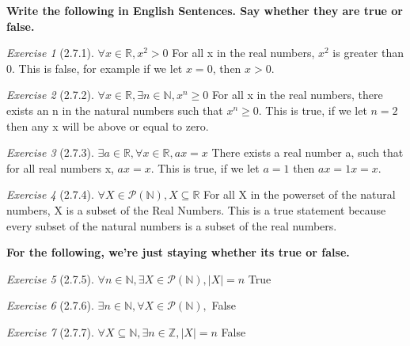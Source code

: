 \documentclass[12pt]{amsart}
\theoremstyle{remark}
\newtheorem*{exercise}{Exercise}%
\newcommand{\RR}{\ensuremath{\mathbb R}} %
\newcommand{\NN}{\ensuremath{\mathbb N}}
\newcommand{\ZZ}{\ensuremath{\mathbb Z}}
\theoremstyle{mycomment}
\begin{document}
\thispagestyle{fancy}

\textbf{Write the following in English Sentences. Say whether they are true or false.}
\begin{exercise}[2.7.1] $\forall x \in \RR, x^2 > 0$ \newline 
For all x in the real numbers, $x^2$ is greater than 0. \newline
This is false, for example if we let $x = 0$, then $x > 0$.
\end{exercise}
\begin{exercise}[2.7.2] $\forall x \in \RR, \exists n \in \NN, x^n \geq 0$ \newline
	For all x in the real numbers, there exists an n in the natural numbers such that $x^n \geq 0$. \newline
	This is true, if we let $n = 2$ then any x will be above or equal to zero.
\end{exercise}
\begin{exercise}[2.7.3] $\exists a \in \RR, \forall x \in \RR, ax=x$ \newline
	There exists a real number a, such that for all real numbers x, $ax = x.$ \newline
	This is true, if we let $a = 1$ then $ax = 1x = x$.
\end{exercise}
\begin{exercise}[2.7.4] $\forall X \in \mathcal{P} (\NN), X \subseteq \RR$ \newline
	For all X in the powerset of the natural numbers, X is a subset of the Real Numbers. \newline
	This is a true statement because every subset of the natural numbers is a subset of the real numbers.
\end{exercise}
\textbf{For the following, we're just staying whether its true or false.}
\begin{exercise}[2.7.5] $\forall n \in \NN, \exists X \in \mathcal{P} (\NN), |X| = n $ \newline
	True
\end{exercise}
\begin{exercise}[2.7.6] $\exists n \in \NN, \forall X \in \mathcal{P} (\NN),$ \newline
	False
\end{exercise}
\begin{exercise}[2.7.7] $\forall X \subseteq \NN, \exists n \in \ZZ, |X| = n$ \newline
	False
\end{exercise}
\end{document}
